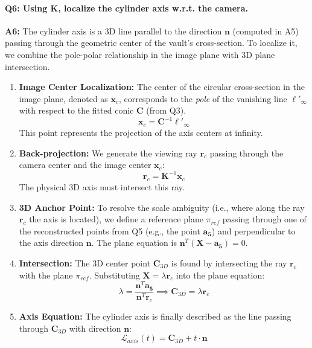 \documentclass[a4paper,11pt]{article}
\newcommand{\matr}[1]{\bm{#1}}     %
\newcommand{\vect}[1]{\mathbf{#1}}  %
\begin{document}

\paragraph{Q6: Using $\matr{K}$, localize the cylinder axis w.r.t. the camera.}

\textbf{A6:} The cylinder axis is a 3D line parallel to the direction $\vect{n}$ (computed in A5) passing through the geometric center of the vault's cross-section.
To localize it, we combine the pole-polar relationship in the image plane with 3D plane intersection.

\begin{enumerate}
    \item \textbf{Image Center Localization:} The center of the circular cross-section in the image plane, denoted as $\vect{x}_c$, corresponds to the \textit{pole} of the vanishing line $\ell'_\infty$ with respect to the fitted conic $\matr{C}$ (from Q3). 
    \begin{equation}
        \vect{x}_c = \matr{C}^{-1} \ell'_\infty
    \end{equation}
    This point represents the projection of the axis centers at infinity.
    
    \item \textbf{Back-projection:} We generate the viewing ray $\vect{r}_c$ passing through the camera center and the image center $\vect{x}_c$:
    \begin{equation}
        \vect{r}_c = \matr{K}^{-1} \vect{x}_c
    \end{equation}
    The physical 3D axis must intersect this ray.
    
    \item \textbf{3D Anchor Point:} To resolve the scale ambiguity (i.e., where along the ray $\vect{r}_c$ the axis is located), we define a reference plane $\pi_{ref}$ passing through one of the reconstructed points from Q5 (e.g., the point $\vect{a_5}$) and perpendicular to the axis direction $\vect{n}$. The plane equation is $\vect{n}^T (\vect{X} - \vect{a_5}) = 0$.
    
    \item \textbf{Intersection:} The 3D center point $\vect{C}_{3D}$ is found by intersecting the ray $\vect{r}_c$ with the plane $\pi_{ref}$. Substituting $\vect{X} = \lambda \vect{r}_c$ into the plane equation:
    \begin{equation}
        \lambda = \frac{\vect{n}^T \vect{a_5}}{\vect{n}^T \vect{r}_c} \implies \vect{C}_{3D} = \lambda \vect{r}_c
    \end{equation}
    
    \item \textbf{Axis Equation:} The cylinder axis is finally described as the line passing through $\vect{C}_{3D}$ with direction $\vect{n}$:
    \begin{equation}
        \mathcal{L}_{axis}(t) = \vect{C}_{3D} + t \cdot \vect{n}
    \end{equation}
\end{enumerate}
\end{document}
